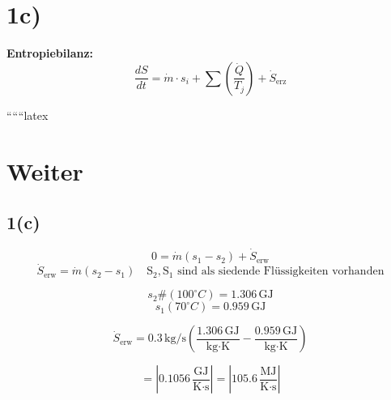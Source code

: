 

\section*{1c)}

\textbf{Entropiebilanz:}
\[
\frac{dS}{dt} = \dot{m} \cdot s_i + \sum \left( \frac{\dot{Q}}{T_j} \right) + \dot{S}_{\text{erz}}
\]

 

``````latex


\section*{Weiter}

\subsection*{1(c)}
\begin{equation*}
0 = \dot{m} (s_1 - s_2) + \dot{S}_{\text{erw}}
\end{equation*}
\begin{equation*}
\dot{S}_{\text{erw}} = \dot{m} (s_2 - s_1) \quad \text{S}_2, \text{S}_1 \text{ sind als siedende Flüssigkeiten vorhanden}
\end{equation*}

\begin{equation*}
s_2 \# (100^\circ C) = 1.306 \, \text{GJ}
\end{equation*}
\begin{equation*}
s_1 (70^\circ C) = 0.959 \, \text{GJ}
\end{equation*}

\begin{equation*}
\dot{S}_{\text{erw}} = 0.3 \, \text{kg/s} \left( \frac{1.306 \, \text{GJ}}{\text{kg} \cdot \text{K}} - \frac{0.959 \, \text{GJ}}{\text{kg} \cdot \text{K}} \right)
\end{equation*}

\begin{equation*}
= \left| 0.1056 \, \frac{\text{GJ}}{\text{K} \cdot \text{s}} \right| = \left| 105.6 \, \frac{\text{MJ}}{\text{K} \cdot \text{s}} \right|
\end{equation*}